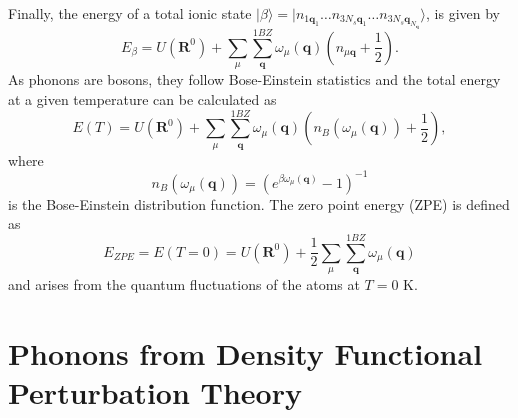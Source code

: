 Finally, the energy of a total ionic state $|\beta\rangle=|n_{1\mathbf{q}_{1}}\dots n_{3N_{s}\mathbf{q}_{1}}\dots n_{3N_{s}\mathbf{q}_{N_{\mathbf{q}}}}\rangle$, is given by
\begin{equation}
 E_{\beta}=U(\mathbf{R}^{0})+\sum_{\mu}\sum_{\mathbf{q}}^{1BZ}\omega_{\mu}(\mathbf{q})\left(n_{\mu\mathbf{q}}+\frac{1}{2}\right).
\end{equation}
As phonons are bosons, they follow Bose-Einstein statistics and the total energy at a given temperature can be calculated as
\begin{equation}
 E(T)=U(\mathbf{R}^{0})+\sum_{\mu}\sum_{\mathbf{q}}^{1BZ}\omega_{\mu}(\mathbf{q})\left(n_{B}(\omega_{\mu}(\mathbf{q}))+\frac{1}{2}\right),
\end{equation}
where 
\begin{equation}
 n_{B}(\omega_{\mu}(\mathbf{q}))=(e^{\beta\omega_{\mu}(\mathbf{q})}-1)^{-1}
\end{equation}
is the Bose-Einstein distribution function. The zero point energy (ZPE) is defined as
\begin{equation}
 E_{ZPE}=E(T=0)=U(\mathbf{R}^{0})+\frac{1}{2}\sum_{\mu}\sum_{\mathbf{q}}^{1BZ}\omega_{\mu}(\mathbf{q})
\end{equation}
and arises from the quantum fluctuations of the atoms at $T=0$ K.

\section{Phonons from Density Functional Perturbation Theory}
\label{dfpt-2bfc}

